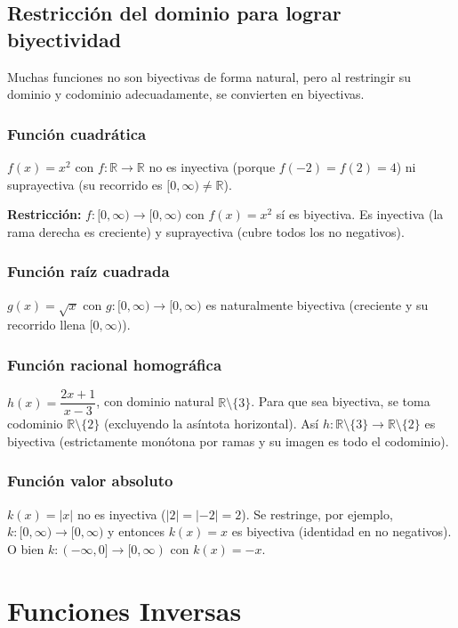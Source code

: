 \documentclass[12pt,a4paper]{article}
\begin{document}
\subsection{Restricción del dominio para lograr biyectividad}

Muchas funciones no son biyectivas de forma natural, pero al restringir su dominio y codominio adecuadamente, se convierten en biyectivas.

\subsubsection{Función cuadrática}
$f(x)=x^2$ con $f:\mathbb{R}\to\mathbb{R}$ no es inyectiva (porque $f(-2)=f(2)=4$) ni suprayectiva (su recorrido es $[0,\infty)\neq\mathbb{R}$).

\textbf{Restricción:} $f:[0,\infty)\to[0,\infty)$ con $f(x)=x^2$ sí es biyectiva. Es inyectiva (la rama derecha es creciente) y suprayectiva (cubre todos los no negativos).

\subsubsection{Función raíz cuadrada}
$g(x)=\sqrt{x}$ con $g:[0,\infty)\to[0,\infty)$ es naturalmente biyectiva (creciente y su recorrido llena $[0,\infty)$).

\subsubsection{Función racional homográfica}
$h(x)=\dfrac{2x+1}{x-3}$, con dominio natural $\mathbb{R}\setminus\{3\}$. Para que sea biyectiva, se toma codominio $\mathbb{R}\setminus\{2\}$ (excluyendo la asíntota horizontal). Así $h:\mathbb{R}\setminus\{3\}\to\mathbb{R}\setminus\{2\}$ es biyectiva (estrictamente monótona por ramas y su imagen es todo el codominio).

\subsubsection{Función valor absoluto}
$k(x)=|x|$ no es inyectiva ($|2|=|-2|=2$). Se restringe, por ejemplo, $k:[0,\infty)\to[0,\infty)$ y entonces $k(x)=x$ es biyectiva (identidad en no negativos). O bien $k:(-\infty,0]\to[0,\infty)$ con $k(x)=-x$.

\section{Funciones Inversas}
\end{document}
